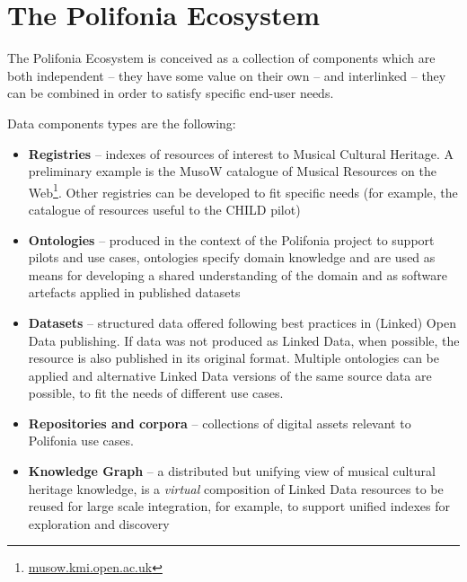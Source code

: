 \chapter{The Polifonia Ecosystem}\label{ch:ecosystem}

The Polifonia Ecosystem is conceived as a collection of components which are both independent -- they have some value on their own -- and interlinked -- they can be combined in order to satisfy specific end-user needs.

Data components types are the following:
\begin{itemize}
\item \textbf{Registries} -- indexes of resources of interest to Musical Cultural Heritage. A preliminary example is the MusoW catalogue of Musical Resources on the Web\footnote{\url{musow.kmi.open.ac.uk}}. Other registries can be developed to fit specific needs (for example, the catalogue of resources useful to the CHILD pilot)
\item \textbf{Ontologies} -- produced in the context of the Polifonia project to support pilots and use cases, ontologies specify domain knowledge and are used as means for developing a shared understanding of the domain and as software artefacts applied in published datasets
\item \textbf{Datasets} -- structured data offered following best practices in (Linked) Open Data publishing. If data was not produced as Linked Data, when possible, the resource is also published in its original format. Multiple ontologies can be applied and alternative Linked Data versions of the same source data are possible, to fit the needs of different use cases.
\item \textbf{Repositories and corpora} -- collections of digital assets relevant to Polifonia use cases.
\item \textbf{Knowledge Graph} -- a distributed but unifying view of musical cultural heritage knowledge, is a \textit{virtual} composition of Linked Data resources to be reused for large scale integration, for example, to support unified indexes for exploration and discovery

\end{itemize}

